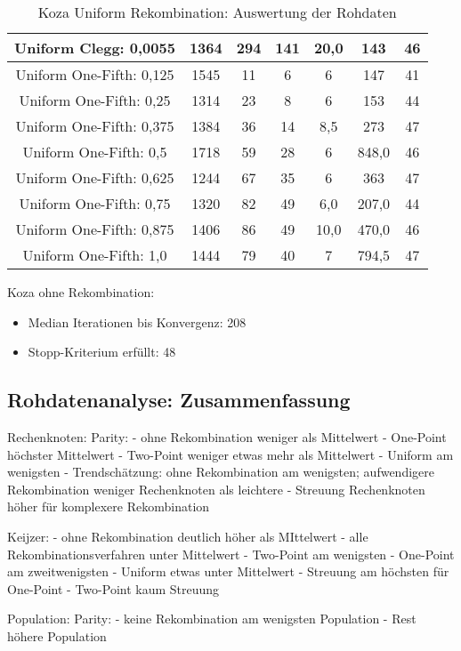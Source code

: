 \begin{table}[H]
\begin{tabular}{c | c | c | c | c | c | c}
		\hline
		Uniform Clegg: 0,0055 & 1364 & 294 & 141 & 20,0 & 143 & 46\\
		\hline
		Uniform One-Fifth: 0,125 & 1545 & 11 & 6 & 6 & 147 & 41\\
		\hline
		Uniform One-Fifth: 0,25 & 1314 & 23 & 8 & 6 & 153 & 44\\
		\hline
		Uniform One-Fifth: 0,375 & 1384 & 36 & 14 & 8,5 & 273 & 47\\
		\hline
		Uniform One-Fifth: 0,5 & 1718 & 59 & 28 & 6 & 848,0 & 46\\
		\hline
		Uniform One-Fifth: 0,625 & 1244 & 67 & 35 & 6 & 363 & 47\\
		\hline
		Uniform One-Fifth: 0,75 & 1320 & 82 & 49 & 6,0 & 207,0 & 44\\
		\hline
		Uniform One-Fifth: 0,875 & 1406 & 86 & 49 & 10,0 & 470,0 & 46\\
		\hline
		Uniform One-Fifth: 1,0 & 1444 & 79 & 40 & 7 & 794,5 & 47\\
	\end{tabular}
	\caption{Koza Uniform Rekombination: Auswertung der Rohdaten}
	\label{table:kozaUniformRohdaten}
\end{table}

Koza ohne Rekombination:
\begin{itemize}
	\item Median Iterationen bis Konvergenz: 208
	\item Stopp-Kriterium erfüllt: 48
\end{itemize}


\subsection{Rohdatenanalyse: Zusammenfassung}
\label{subsec:rohdatenZusammenfassung}

Rechenknoten:
Parity:
- ohne Rekombination weniger als Mittelwert
- One-Point höchster Mittelwert
- Two-Point weniger etwas mehr als Mittelwert
- Uniform am wenigsten
- Trendschätzung: ohne Rekombination am wenigsten; aufwendigere Rekombination weniger Rechenknoten als leichtere
- Streuung Rechenknoten höher für komplexere Rekombination

Keijzer:
- ohne Rekombination deutlich höher als MIttelwert
- alle Rekombinationsverfahren unter Mittelwert
- Two-Point am wenigsten
- One-Point am zweitwenigsten
- Uniform etwas unter Mittelwert
- Streuung am höchsten für One-Point
- Two-Point kaum Streuung

Population:
Parity:
- keine Rekombination am wenigsten Population
- Rest höhere Population

